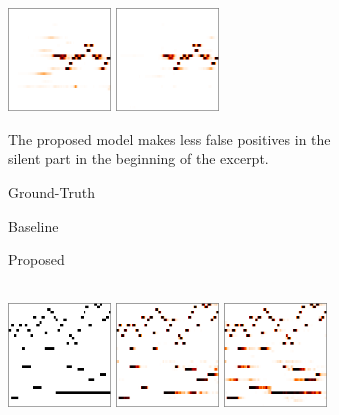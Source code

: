 \begin{figure}
\begin{subfigure}[b]{\textwidth}
	\quad
	\includegraphics[width=0.3\textwidth]{cropped/2298-baseline.png}
	\quad
	\includegraphics[width=0.3\textwidth]{cropped/2298-proposed.png}
	\caption{The proposed model makes less false positives in the silent part in the beginning of the excerpt.}
	\label{}
\end{subfigure}
\begin{subfigure}[b]{\textwidth}
	\vspace{2em}
	\centering
	\parbox{0.3\textwidth}{\footnotesize\centering Ground-Truth}
	\quad
	\parbox{0.3\textwidth}{\footnotesize\centering Baseline}
	\quad
	\parbox{0.3\textwidth}{\footnotesize\centering Proposed}
	\\
	\vspace{0.5em}
	\includegraphics[width=0.3\textwidth]{cropped/2303-label.png}
	\quad
	\includegraphics[width=0.3\textwidth]{cropped/2303-baseline.png}
	\quad
	\includegraphics[width=0.3\textwidth]{cropped/2303-proposed.png}

\end{subfigure}
\end{figure}
